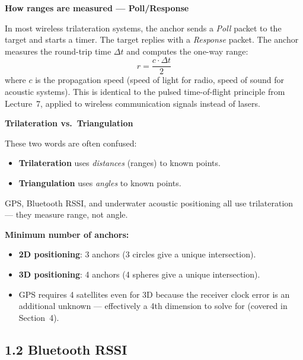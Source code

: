 \documentclass[12pt, a4paper]{article}
\begin{document}
\begin{notebox}
  \textbf{How ranges are measured --- Poll/Response}

  In most wireless trilateration systems, the anchor sends a
  \emph{Poll} packet to the target and starts a timer.
  The target replies with a \emph{Response} packet.
  The anchor measures the round-trip time $\Delta t$ and computes the
  one-way range:
  \[
    r = \frac{c \cdot \Delta t}{2}
  \]
  where $c$ is the propagation speed (speed of light for radio,
  speed of sound for acoustic systems).
  This is identical to the pulsed time-of-flight principle from
  Lecture~7, applied to wireless communication signals instead of lasers.
\end{notebox}

\begin{notebox}
  \textbf{Trilateration vs.\ Triangulation}

  These two words are often confused:
  \begin{itemize}[leftmargin=1.2em,itemsep=2pt]
    \item \textbf{Trilateration} uses \emph{distances} (ranges) to
      known points.
    \item \textbf{Triangulation} uses \emph{angles} to known points.
  \end{itemize}
  GPS, Bluetooth RSSI, and underwater acoustic positioning all use
  trilateration --- they measure range, not angle.
\end{notebox}

\textbf{Minimum number of anchors:}
\begin{itemize}[leftmargin=1.2em,itemsep=2pt]
  \item \textbf{2D positioning}: 3 anchors (3 circles give a unique
    intersection).
  \item \textbf{3D positioning}: 4 anchors (4 spheres give a unique
    intersection).
  \item GPS requires 4 satellites even for 3D because the receiver
    clock error is an additional unknown --- effectively a 4th
    dimension to solve for (covered in Section~4).
\end{itemize}

\subsection*{1.2 \quad Bluetooth RSSI}
\end{document}
